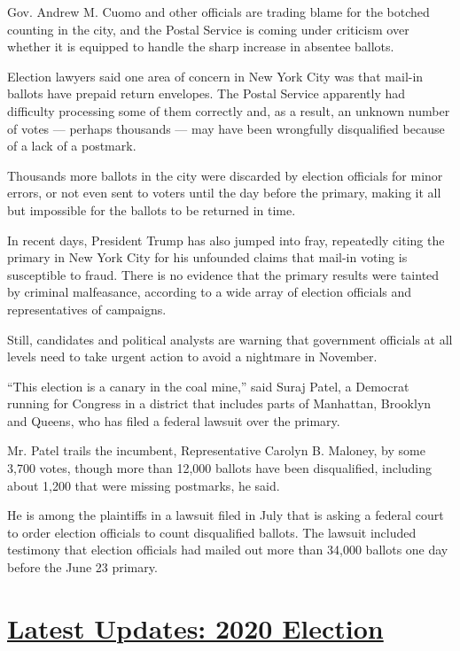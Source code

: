 Gov. Andrew M. Cuomo and other officials are trading blame for the
botched counting in the city, and the Postal Service is coming under
criticism over whether it is equipped to handle the sharp increase in
absentee ballots.

Election lawyers said one area of concern in New York City was that
mail-in ballots have prepaid return envelopes. The Postal Service
apparently had difficulty processing some of them correctly and, as a
result, an unknown number of votes --- perhaps thousands --- may have
been wrongfully disqualified because of a lack of a postmark.

Thousands more ballots in the city were discarded by election officials
for minor errors, or not even sent to voters until the day before the
primary, making it all but impossible for the ballots to be returned in
time.

In recent days, President Trump has also jumped into fray, repeatedly
citing the primary in New York City for his unfounded claims that
mail-in voting is susceptible to fraud. There is no evidence that the
primary results were tainted by criminal malfeasance, according to a
wide array of election officials and representatives of campaigns.

Still, candidates and political analysts are warning that government
officials at all levels need to take urgent action to avoid a nightmare
in November.

``This election is a canary in the coal mine,'' said Suraj Patel, a
Democrat running for Congress in a district that includes parts of
Manhattan, Brooklyn and Queens, who has filed a federal lawsuit over the
primary.

Mr. Patel trails the incumbent, Representative Carolyn B. Maloney, by
some 3,700 votes, though more than 12,000 ballots have been
disqualified, including about 1,200 that were missing postmarks, he
said.

He is among the plaintiffs in a lawsuit filed in July that is asking a
federal court to order election officials to count disqualified ballots.
The lawsuit included testimony that election officials had mailed out
more than 34,000 ballots one day before the June 23 primary.

\hypertarget{latest-updates-2020-election}{%
\section{\texorpdfstring{\href{https://www.nytimes3xbfgragh.onion/2020/08/03/us/elections/biden-vs-trump.html?action=click\&pgtype=Article\&state=default\&region=MAIN_CONTENT_1\&context=storylines_live_updates}{Latest
Updates: 2020
Election}}{Latest Updates: 2020 Election}}\label{latest-updates-2020-election}}

